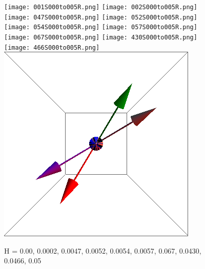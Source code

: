 \documentclass{article}
\begin{document}
\begin{figure}[ht]
\centering
\texttt{[image: 001S000to005R.png]}
\texttt{[image: 002S000to005R.png]}
\texttt{[image: 047S000to005R.png]}
\texttt{[image: 052S000to005R.png]}
\texttt{[image: 054S000to005R.png]}
\texttt{[image: 057S000to005R.png]}
\texttt{[image: 067S000to005R.png]}
\texttt{[image: 430S000to005R.png]}
\texttt{[image: 466S000to005R.png]}
\includegraphics[scale=0.22]{501S000to005R.png}
\caption{H = 0.00, 0.0002, 0.0047, 0.0052, 0.0054, 0.0057, 0.067, 0.0430, 0.0466, 0.05}
\end{figure}
\end{document}
